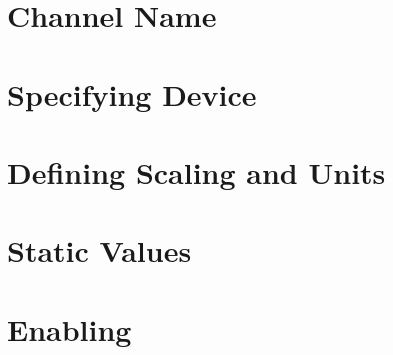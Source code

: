 \thispagestyle{fancy}
\pagestyle{fancy}
\section{Channel Name}
\section{Specifying Device}
\section{Defining Scaling and Units}
\section{Static Values}
\section{Enabling}

